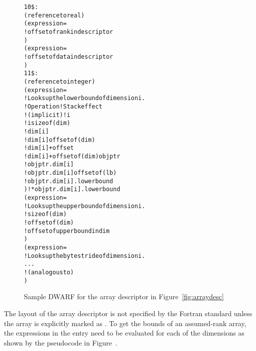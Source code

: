 \begin{figure}[!ht]
\begin{dwflisting}
\begin{alltt}
10\$:  \DWTAGarraytype
          \DWATtype(reference to real)
          \DWATrank(expression=
              \DWOPpushobjectaddress
              \DWOPlitn                        ! offset of rank in descriptor
              \DWOPplus
              \DWOPderef)
          \DWATdatalocation(expression=
              \DWOPpushobjectaddress
              \DWOPlitn                        ! offset of data in descriptor
              \DWOPplus
              \DWOPderef)
11\$:     \DWTAGgenericsubrange
              \DWATtype(reference to integer)
              \DWATlowerbound(expression=
              !   Looks up the lower bound of dimension i.
              !   Operation                       ! Stack effect
              !   (implicit)                      ! i
                  \DWOPlitn                    ! i sizeof(dim)
                  \DWOPmul                       ! dim[i]
                  \DWOPlitn                    ! dim[i] offsetof(dim)
                  \DWOPplus                      ! dim[i]+offset
                  \DWOPpushobjectaddress       ! dim[i]+offsetof(dim) objptr
                  \DWOPplus                      ! objptr.dim[i]
                  \DWOPlitn                    ! objptr.dim[i] offsetof(lb)
                  \DWOPplus                      ! objptr.dim[i].lowerbound
                  \DWOPderef)                    ! *objptr.dim[i].lowerbound
              \DWATupperbound(expression=
              !   Looks up the upper bound of dimension i.
                  \DWOPlitn                    ! sizeof(dim)
                  \DWOPmul
                  \DWOPlitn                    ! offsetof(dim)
                  \DWOPplus
                  \DWOPpushobjectaddress
                  \DWOPplus
                  \DWOPlitn                    ! offset of upperbound in dim
                  \DWOPplus
                  \DWOPderef)
              \DWATbytestride(expression=
              !   Looks up the byte stride of dimension i.
                  ...
              !   (analogous to \DWATupperboundNAME)
                  )
\end{alltt}
\end{dwflisting}
\caption{Sample DWARF for the array descriptor in Figure~\ref{fig:arraydesc}}
\label{fig:assumedrankdwarf}
\end{figure}

The layout of the array descriptor is not specified by the Fortran
standard unless the array is explicitly marked as . To
get the bounds of an assumed-rank array, the expressions in the
\DWTAGgenericsubrange{}
entry need to be evaluated for each of the
\DWATrank{} dimensions as shown by the pseudocode in
Figure~.

